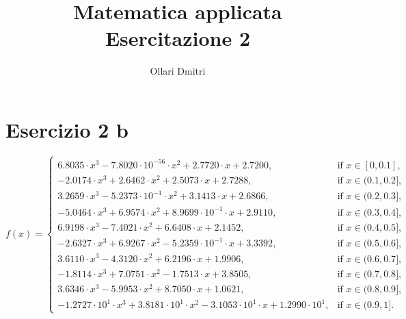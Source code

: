 \documentclass{article}
\title{Matematica applicata \\[1ex] \large Esercitazione 2}
\author{Ollari Dmitri}
\begin{document}
    \maketitle



\section{Esercizio 2 b}
\begin{equation*}
	f(x) = \begin{cases}
		6.8035\cdot x^3 -7.8020 \cdot 10^{-56}\cdot x^2 + 2.7720\cdot x + 2.7200, & \text{if } x \in [0,0.1], \\-2.0174\cdot x^3 + 2.6462\cdot x^2 + 2.5073\cdot x + 2.7288, & \text{if } x \in (0.1,0.2], \\3.2659\cdot x^3 -5.2373 \cdot 10^{-1}\cdot x^2 + 3.1413\cdot x + 2.6866, & \text{if } x \in (0.2,0.3], \\-5.0464\cdot x^3 + 6.9574\cdot x^2 + 8.9699 \cdot 10^{-1}\cdot x + 2.9110, & \text{if } x \in (0.3,0.4], \\6.9198\cdot x^3 -7.4021\cdot x^2 + 6.6408\cdot x + 2.1452, & \text{if } x \in (0.4,0.5], \\-2.6327\cdot x^3 + 6.9267\cdot x^2 -5.2359 \cdot 10^{-1}\cdot x + 3.3392, & \text{if } x \in (0.5,0.6], \\3.6110\cdot x^3 -4.3120\cdot x^2 + 6.2196\cdot x + 1.9906, & \text{if } x \in (0.6,0.7], \\-1.8114\cdot x^3 + 7.0751\cdot x^2 -1.7513\cdot x + 3.8505, & \text{if } x \in (0.7,0.8], \\3.6346\cdot x^3 -5.9953\cdot x^2 + 8.7050\cdot x + 1.0621, & \text{if } x \in (0.8,0.9], \\-1.2727 \cdot 10^{1}\cdot x^3 + 3.8181 \cdot 10^{1}\cdot x^2 -3.1053 \cdot 10^{1}\cdot x + 1.2990 \cdot 10^{1}, & \text{if } x \in (0.9,1].
	\end{cases}
\end{equation*}
\end{document}
